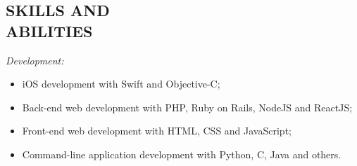 \documentclass[margin]{res}
\begin{document}
\begin{resume}
		\section{SKILLS AND \\ABILITIES}
			{\sl Development:}
			\begin{itemize}
				\item iOS development with Swift and Objective-C;
				\item Back-end web development with PHP, Ruby on Rails, NodeJS and ReactJS;
				\item Front-end web development with HTML, CSS and JavaScript;
				\item Command-line application development with Python, C, Java and others.
	  		\end{itemize}

\end{resume}
\end{document}
